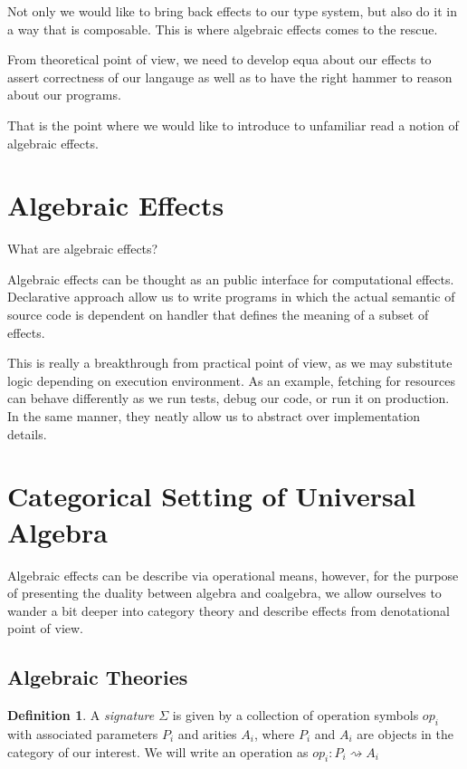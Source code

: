 \documentclass[declaration,shortabstract]{iithesis}
\theoremstyle{definition} \newtheorem{definition}{Definition}[chapter]
\theoremstyle{remark} \newtheorem{remark}[definition]{Observation}
\theoremstyle{plain} \newtheorem{theorem}[definition]{Theorem}
\theoremstyle{plain} \newtheorem{lemma}[definition]{Lemma}
\begin{document}
Not only we would like to bring back effects to our type system, but also do it
in a way that is composable. This is where algebraic effects comes to the rescue.


From theoretical point of view, we need to develop equa about our effects
to assert correctness of our langauge as well as to have the right hammer
to reason about our programs.

That is the point where we would like to introduce to unfamiliar read a notion
of algebraic effects.

\section{Algebraic Effects}

What are algebraic effects?


Algebraic effects can be thought as an public interface for computational effects.
Declarative approach allow us to write programs in which the actual semantic of
source code is dependent on handler that defines the meaning of a subset of effects.

This is really a breakthrough from practical point of view, as we may substitute
logic depending on execution environment. As an example, fetching for resources
can behave differently as we run tests, debug our code, or run it on production.
In the same manner, they neatly allow us to abstract over implementation details.


\section{Categorical Setting of Universal Algebra}

Algebraic effects can be describe via operational means, however,
for the purpose of presenting the duality between algebra and coalgebra,
we allow ourselves to wander a bit deeper into category theory and describe
effects from denotational point of view.

    \subsection{Algebraic Theories}

    \begin{definition}

    A \textit{signature $ \Sigma $} is given by a collection of operation symbols $ op_{i} $
    with associated parameters $ P_{i} $ and arities $ A_{i} $, where
    $ P_{i} $ and $ A_{i} $ are objects in the category of our interest.
    We will write an operation as $ op_{i} : P_{i} \rightsquigarrow A_{i} $

    \end{definition}
\end{document}
